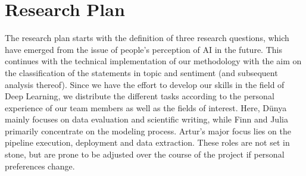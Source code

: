 \documentclass[11pt]{article}
\begin{document}
\section{Research Plan}
The research plan starts with the definition of three research questions, which have emerged from the issue of people’s perception of AI in the future.
This continues with the technical implementation of our methodology with the aim on the classification of the statements in topic and sentiment (and subsequent analysis thereof).
Since we have the effort to develop our skills in the field of Deep Learning, we distribute the different tasks according to the personal experience of our team members as well as the fields of interest.
Here, Dünya mainly focuses on data evaluation and scientific writing, while Finn and Julia primarily concentrate on the modeling process. Artur's major focus lies on the pipeline execution, deployment and data extraction.
These roles are not set in stone, but are prone to be adjusted over the course of the project if personal preferences change.
\end{document}
